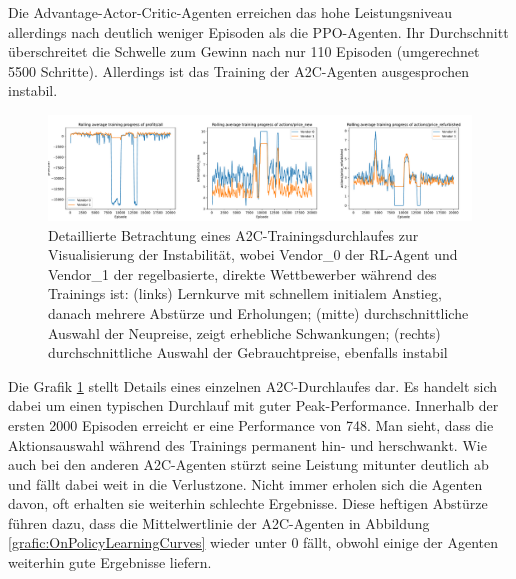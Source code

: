 Die Advantage-Actor-Critic-Agenten erreichen das hohe Leistungsniveau allerdings nach deutlich weniger Episoden als die PPO-Agenten.
Ihr Durchschnitt überschreitet die Schwelle zum Gewinn nach nur 110 Episoden (umgerechnet 5500 Schritte).
Allerdings ist das Training der A2C-Agenten ausgesprochen instabil.
\begin{figure}[htbp]
	\centering
	\includegraphics[width=\textwidth]{main/a2c_detailed_analysis.pdf}
	\caption{
		Detaillierte Betrachtung eines A2C-Trainingsdurchlaufes zur Visualisierung der Instabilität, wobei Vendor\_0 der RL-Agent und Vendor\_1 der regelbasierte, direkte Wettbewerber während des Trainings ist:
		(links) Lernkurve mit schnellem initialem Anstieg, danach mehrere Abstürze und Erholungen;
		(mitte) durchschnittliche Auswahl der Neupreise, zeigt erhebliche Schwankungen;
		(rechts) durchschnittliche Auswahl der Gebrauchtpreise, ebenfalls instabil
	}
	\label{grafic:A2CInstability}
\end{figure}
Die Grafik \ref{grafic:A2CInstability} stellt Details eines einzelnen A2C-Durchlaufes dar.
Es handelt sich dabei um einen typischen Durchlauf mit guter Peak-Performance.
Innerhalb der ersten 2000 Episoden erreicht er eine Performance von 748.
Man sieht, dass die Aktionsauswahl während des Trainings permanent hin- und herschwankt.
Wie auch bei den anderen A2C-Agenten stürzt seine Leistung mitunter deutlich ab und fällt dabei weit in die Verlustzone.
Nicht immer erholen sich die Agenten davon, oft erhalten sie weiterhin schlechte Ergebnisse.
Diese heftigen Abstürze führen dazu, dass die Mittelwertlinie der A2C-Agenten in Abbildung \ref{grafic:OnPolicyLearningCurves} wieder unter 0 fällt, obwohl einige der Agenten weiterhin gute Ergebnisse liefern.

